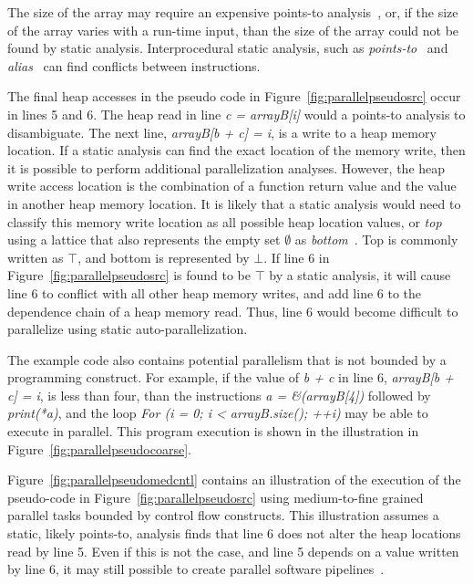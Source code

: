 {The size of the array may require an expensive points-to analysis~\cite{steensgaard:96:popl}, or, if the size of the array varies with a run-time input, than the size of the array could not be found by static analysis. Interprocedural static analysis, such as \textit{points-to}~\cite{steensgaard:96:popl} and \textit{alias}~\cite{cooper:89:popl} can find conflicts between instructions.

The final heap accesses in the pseudo code in Figure~\ref{fig:parallelpseudosrc} occur in lines 5 and 6.  The heap read in line \textit{c = arrayB[i]} would a points-to analysis to disambiguate.  The next line, \textit{arrayB[b + c] = i}, is a write to a heap memory location.  If a static analysis can find the exact location of the memory write, then it is possible to perform additional parallelization analyses.  However, the heap write access location is the combination of a function return value and the value in another heap memory location.  It is likely that a static analysis would need to classify this memory write location as all possible heap location values, or \textit{top} using a lattice that also represents the empty set $\emptyset$ as \textit{bottom}~\cite{Tarski:1955kx, Davey:2002fj}.  Top is commonly written as $\top$, and bottom is represented by $\bot$.  If line 6 in Figure~\ref{fig:parallelpseudosrc} is found to be $\top$ by a static analysis, it will cause line 6 to conflict with all other heap memory writes, and add line 6 to the dependence chain of a heap memory read. Thus, line 6 would become difficult to parallelize using static auto-parallelization.

The example code also contains potential parallelism that is not bounded by a programming construct.  For example, if the value of \textit{b + c} in line 6, \textit{arrayB[b + c] = i}, is less than four, than the instructions \textit{ a = \&(arrayB[4])} followed by \textit{print(*a)}, and the loop \textit{For (i = 0; i < arrayB.size(); ++i)} may be able to execute in parallel.  This program execution is shown in the illustration in Figure~\ref{fig:parallelpseudocoarse}.

Figure~\ref{fig:parallelpseudomedcntl} contains an illustration of the execution of the pseudo-code in Figure~\ref{fig:parallelpseudosrc} using medium-to-fine grained parallel tasks bounded by control flow constructs.  This illustration assumes a static, likely points-to, analysis finds that line 6 does not alter the heap locations read by line 5.  Even if this is not the case, and line 5 depends on a value written by line 6, it may still possible to create parallel software pipelines~\cite{rangan:04:pact, giacomoni:08:ppopp}.

}
